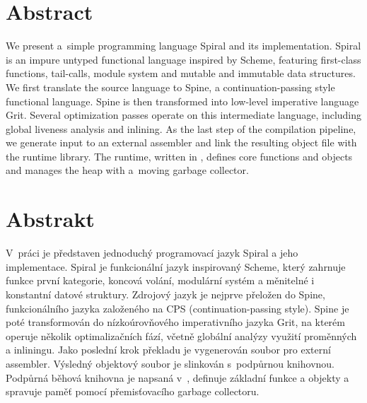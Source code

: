 \begin{adjustwidth}{1.5cm}{1.5cm}

\section*{Abstract}

We present a~simple programming language Spiral and its implementation. Spiral
is an impure untyped functional language inspired by Scheme, featuring
first-class functions, tail-calls, module system and mutable and immutable data
structures. We first translate the source language to Spine, a
continuation-passing style functional language. Spine is then transformed into
low-level imperative language Grit. Several optimization passes operate on this
intermediate language, including global liveness analysis and inlining. As the
last step of the compilation pipeline, we generate input to an external
assembler and link the resulting object file with the runtime library. The
runtime, written in \Cplusplus, defines core functions and objects and manages
the heap with a~moving garbage collector.

\section*{Abstrakt}

V~práci je představen jednoduchý programovací jazyk Spiral a jeho implementace.
Spiral je funkcionální jazyk inspirovaný Scheme, který zahrnuje funkce první
kategorie, koncová volání, modulární systém a měnitelné i konstantní datové
struktury. Zdrojový jazyk je nejprve přeložen do Spine, funkcionálního jazyka
založeného na CPS (continuation-passing style). Spine je poté transformován do
nízkoúrovňového imperativního jazyka Grit, na kterém operuje několik
optimalizačních fází, včetně globální analýzy využití proměnných a inliningu.
Jako poslední krok překladu je vygenerován soubor pro externí assembler.
Výsledný objektový soubor je slinkován s~podpůrnou knihovnou. Podpůrná běhová
knihovna je napsaná v~\Cplusplus, definuje základní funkce a objekty a spravuje
paměť pomocí přemisťovacího garbage collectoru.

\end{adjustwidth}
